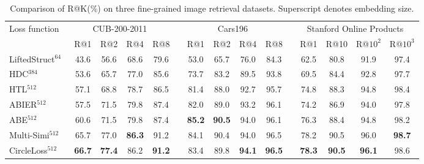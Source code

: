 \documentclass[10pt,twocolumn,letterpaper]{article}
\begin{document}
\begin{table}[t]
    \small
    \centering
    \caption{Comparison of R@K(\%) on three fine-grained image retrieval datasets. Superscript denotes embedding size.}
    \label{tab:cub-cars}
    \begin{tabularx}{\textwidth}{Xcccccccccccccc}
    \toprule
     \multirow{2}{*}{Loss function} & \multicolumn{4}{c}{CUB-200-2011~\cite{WahCUB_200_2011}} && \multicolumn{4}{c}{Cars196~\cite{krause20133d}} && \multicolumn{4}{c}{Stanford Online Products~\cite{oh2016deep}}\\
     \cmidrule{2-5} \cmidrule{7-10} \cmidrule{12-15}
  & R@1 & R@2 & R@4 & R@8 &  & R@1 & R@2 & R@4 & R@8 &  & R@1 &R@10& R@$10^2$ & R@$10^3$\\
     \midrule
     
    LiftedStruct$^{64}$~\cite{oh2016deep}      &43.6 &56.6&68.6&79.6  &&53.0&65.7&76.0&84.3  &&62.5&80.8&91.9&97.4 \\
    HDC$^{384}$~\cite{Song_2017_CVPRHDC}              &53.6 &65.7&77.0&85.6  &&73.7&83.2&89.5&93.8  &&69.5&84.4&92.8&97.7\\
    HTL$^{512}$~\cite{Ge_2018_ECCVHTL}               &57.1 &68.8&78.7&86.5  &&81.4&88.0&92.7&95.7  &&74.8&88.3&94.8&98.4\\
    ABIER$^{512}$~\cite{ABIER}   &57.5 &71.5&79.8&87.4  &&82.0&89.0&93.2&96.1  &&74.2&86.9&94.0&97.8\\
    ABE$^{512}$~\cite{Kim_2018_ECCVABE}    &60.6 &71.5&79.8&87.4  &&\textbf{85.2}&\textbf{90.5}&94.0&96.1  &&76.3&88.4&94.8&98.2\\ 
    Multi-Simi$^{512}$~\cite{wang2019multi} & 65.7 & 77.0 & \textbf{86.3} & 91.2 &&   {84.1} & {90.4} & 94.0 & 96.5 && 78.2 & 90.5 & 96.0 & \textbf{98.7}\\
    CircleLoss$^{512}$                 & \textbf{66.7} & \textbf{77.4} & 86.2 & \textbf{91.2} &&   83.4 & 89.8 & \textbf{94.1} & \textbf{96.5} && \textbf{78.3} & \textbf{90.5} & \textbf{96.1} & 98.6 \\
    
    
    \bottomrule
    \end{tabularx}
\end{table}
\end{document}
